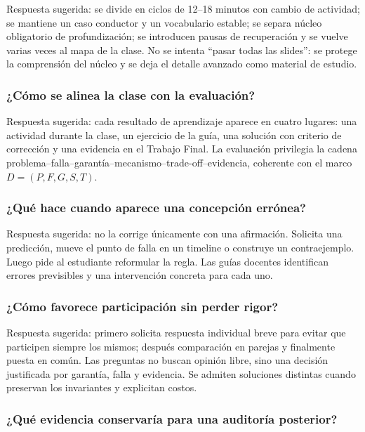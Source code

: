 \documentclass[variant=docente,cover=institutional,mode=screen]{ua-engineering-v6-article}
\begin{document}
Respuesta sugerida: se divide en ciclos de 12--18 minutos con cambio de actividad; se mantiene un caso conductor y un vocabulario estable; se separa núcleo obligatorio de profundización; se introducen pausas de recuperación y se vuelve varias veces al mapa de la clase. No se intenta ``pasar todas las slides'': se protege la comprensión del núcleo y se deja el detalle avanzado como material de estudio.

\subsubsection{¿Cómo se alinea la clase con la evaluación?}

Respuesta sugerida: cada resultado de aprendizaje aparece en cuatro lugares: una actividad durante la clase, un ejercicio de la guía, una solución con criterio de corrección y una evidencia en el Trabajo Final. La evaluación privilegia la cadena problema--falla--garantía--mecanismo--trade-off--evidencia, coherente con el marco $D=(P,F,G,S,T)$.

\subsubsection{¿Qué hace cuando aparece una concepción errónea?}

Respuesta sugerida: no la corrige únicamente con una afirmación. Solicita una predicción, mueve el punto de falla en un timeline o construye un contraejemplo. Luego pide al estudiante reformular la regla. Las guías docentes identifican errores previsibles y una intervención concreta para cada uno.

\subsubsection{¿Cómo favorece participación sin perder rigor?}

Respuesta sugerida: primero solicita respuesta individual breve para evitar que participen siempre los mismos; después comparación en parejas y finalmente puesta en común. Las preguntas no buscan opinión libre, sino una decisión justificada por garantía, falla y evidencia. Se admiten soluciones distintas cuando preservan los invariantes y explicitan costos.

\subsubsection{¿Qué evidencia conservaría para una auditoría posterior?}
\end{document}
